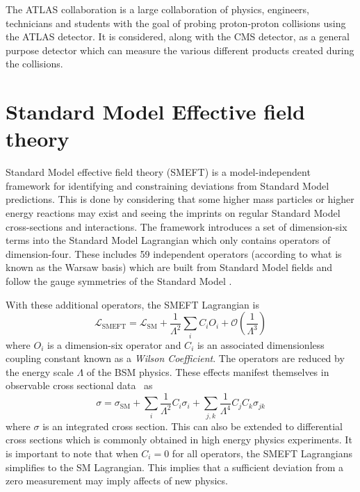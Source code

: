 \documentclass[a4paper,11pt]{article}
\begin{document}
The ATLAS collaboration is a large collaboration of physics, engineers, technicians and students with the goal of probing proton-proton collisions using the ATLAS detector.
It is considered, along with the CMS detector, as a general purpose detector which can measure the various different products created during the collisions.

\section{Standard Model Effective field theory}

Standard Model effective field theory (SMEFT) is a model-independent framework for identifying and constraining deviations from Standard Model predictions.
This is done by considering that some higher mass particles or higher energy reactions may exist and seeing the imprints on regular Standard Model cross-sections and interactions.
The framework introduces a set of dimension-six terms into the Standard Model Lagrangian which only contains operators of dimension-four.
These includes 59 independent operators (according to what is known as the Warsaw basis) which are built from Standard Model fields and follow the gauge symmetries of the Standard Model \cite{Grzadkowski_2010}.

With these additional operators, the SMEFT Lagrangian is
\begin{equation}\label{eq:smeft_lagrangian}
    \mathcal{L}_{\text{SMEFT}} = \mathcal{L}_{\text{SM}} + \frac{1}{\Lambda^2} \sum\limits_{i} C_{i} O_{i} + \mathcal{O}\left(\frac{1}{\Lambda^3}\right)
\end{equation}
where $O_{i}$ is a dimension-six operator and $C_{i}$ is an associated dimensionless coupling constant known as a \emph{Wilson Coefficient}.
The operators are reduced by the energy scale $\Lambda$ of the BSM physics.
These effects manifest themselves in observable cross sectional data~\cite{Hartland_2019} as
\begin{equation}\label{eq:smeft_cross_section}
    \sigma = \sigma_{\text{SM}} + \sum\limits_{i} \frac{1}{\Lambda^2} C_{i} \sigma_{i} + \sum\limits_{j,k} \frac{1}{\Lambda^4} C_{j} C_{k} \sigma_{j k}
\end{equation}
where $\sigma$ is an integrated cross section. This can also be extended to differential cross sections which is commonly obtained in high energy physics experiments.
It is important to note that when $C_{i}=0$ for all operators, the SMEFT Lagrangians simplifies to the SM Lagrangian.
This implies that a sufficient deviation from a zero measurement may imply affects of new physics.
\end{document}
